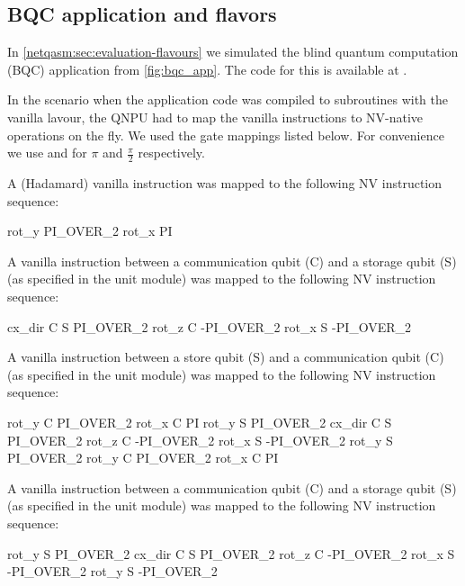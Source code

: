 \subsection{BQC application and flavors}
In \cref{netqasm:sec:evaluation-flavours} we simulated the blind quantum computation
(BQC) application from \cref{fig:bqc_app}. The code for this is available at
\cite{git_squidasm}.

In the scenario when the application code was compiled to subroutines with the
vanilla lavour, the \ac{QNPU} had to map the vanilla instructions to NV-native
operations on the fly. We used the gate mappings listed below. For
convenience we use  and  for $\pi$ and $\frac{\pi}{2}$
respectively.

A  (Hadamard) vanilla instruction was mapped to the following NV instruction sequence:
\begin{nqcode}
  rot_y PI_OVER_2
  rot_x PI\end{nqcode}

A  vanilla instruction between a communication qubit (C) and a storage
qubit (S) (as specified in the unit module) was mapped to the following NV
instruction sequence:
\begin{nqcode}
  cx_dir C S PI_OVER_2
  rot_z C -PI_OVER_2
  rot_x S -PI_OVER_2\end{nqcode}

A  vanilla instruction between a store qubit (S) and a communication
qubit (C) (as specified in the unit module) was mapped to the following NV
instruction sequence:
\begin{nqcode}
  rot_y C PI_OVER_2
  rot_x C PI
  rot_y S PI_OVER_2
  cx_dir C S PI_OVER_2
  rot_z C -PI_OVER_2
  rot_x S -PI_OVER_2
  rot_y S PI_OVER_2
  rot_y C PI_OVER_2
  rot_x C PI\end{nqcode}

A  vanilla instruction between a communication qubit (C) and a storage
qubit (S) (as specified in the unit module) was mapped to the following NV
instruction sequence:
\begin{nqcode}
  rot_y S PI_OVER_2
  cx_dir C S PI_OVER_2
  rot_z C -PI_OVER_2
  rot_x S -PI_OVER_2
  rot_y S -PI_OVER_2\end{nqcode}